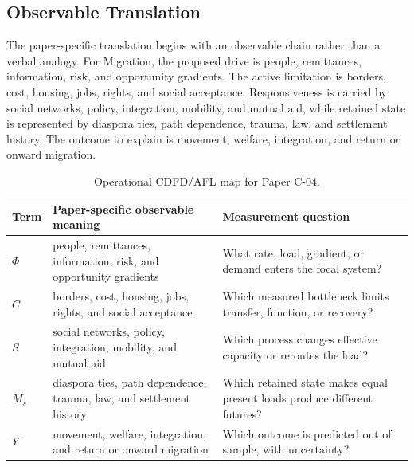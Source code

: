 \documentclass[11pt,a4paper]{article}
\begin{document}
\subsection{Observable Translation}

The paper-specific translation begins with an observable chain rather than a
verbal analogy. For Migration, the proposed drive is people, remittances, information, risk, and opportunity gradients.
The active limitation is borders, cost, housing, jobs, rights, and social acceptance. Responsiveness is carried by
social networks, policy, integration, mobility, and mutual aid, while retained state is represented by
diaspora ties, path dependence, trauma, law, and settlement history. The outcome to explain is movement, welfare, integration, and return or onward migration.

\begin{table}[htbp]
\centering
\small
\caption{Operational CDFD/AFL map for Paper C-04.}
\begin{tabularx}{\textwidth}{|l|X|X|}
\hline
\textbf{Term} & \textbf{Paper-specific observable meaning} & \textbf{Measurement question} \\
\hline
$\Phi$ & people, remittances, information, risk, and opportunity gradients & What rate, load, gradient, or demand enters the focal system? \\
\hline
$C$ & borders, cost, housing, jobs, rights, and social acceptance & Which measured bottleneck limits transfer, function, or recovery? \\
\hline
$S$ & social networks, policy, integration, mobility, and mutual aid & Which process changes effective capacity or reroutes the load? \\
\hline
$M_s$ & diaspora ties, path dependence, trauma, law, and settlement history & Which retained state makes equal present loads produce different futures? \\
\hline
$Y$ & movement, welfare, integration, and return or onward migration & Which outcome is predicted out of sample, with uncertainty? \\
\hline
\end{tabularx}
\end{table}
\end{document}
